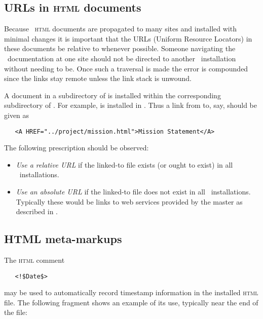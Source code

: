 \subsection*{URLs in \textsc{html} documents}

Because \aipspp\ \textsc{html} documents are propagated to many sites and
installed with minimal changes it is important that the URLs (Uniform Resource
Locators) in these documents be relative to  whenever
possible.  Someone navigating the \aipspp\ documentation at one site should
not be directed to another \aipspp\ installation without needing to be.  Once
such a traversal is made the error is compounded since the links stay remote
unless the link stack is unwound.

A document in a subdirectory of  is installed within the
corresponding subdirectory of .  For example,
 is installed in
.  Thus a link from 
to, say,  should be given as

\begin{verbatim}
   <A HREF="../project/mission.html">Mission Statement</A>
\end{verbatim}

\noindent
The following prescription should be observed:

\begin{itemize}
\item
   {\em Use a relative URL} if the linked-to file exists (or ought to exist)
   in all \aipspp\ installations.

\item
   {\em Use an absolute URL} if the linked-to file does not exist in all
   \aipspp\ installations.  Typically these would be links to web services
   provided by the master as described in .
\end{itemize}

\subsection*{HTML meta-markups}

The \textsc{html} comment

\noindent
\verb+   <!$+\verb+Date$>+

\noindent
may be used to automatically record timestamp information in the installed
\textsc{html} file.  The following fragment shows an example of its use,
typically near the end of the file:

